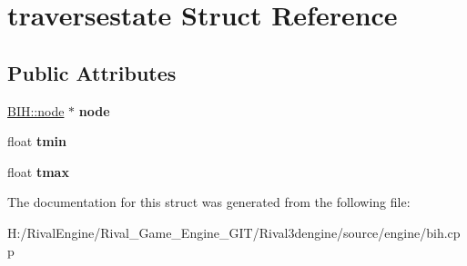 \hypertarget{structtraversestate}{}\section{traversestate Struct Reference}
\label{structtraversestate}
\subsection*{Public Attributes}
\begin{DoxyCompactItemize}
\item 
\mbox{\label{structtraversestate_af6d269c13f87eb542f1c0f374ca15661}} 
\hyperlink{struct_b_i_h_1_1node}{B\+I\+H\+::node} $\ast$ {\bfseries node}
\item 
\mbox{\label{structtraversestate_ad169c3a44f431c4c64904b4e9092d64f}} 
float {\bfseries tmin}
\item 
\mbox{\label{structtraversestate_a04f13cbf29383debad7cd2c248acca5a}} 
float {\bfseries tmax}
\end{DoxyCompactItemize}


The documentation for this struct was generated from the following file\+:\begin{DoxyCompactItemize}
\item 
H\+:/\+Rival\+Engine/\+Rival\+\_\+\+Game\+\_\+\+Engine\+\_\+\+G\+I\+T/\+Rival3dengine/source/engine/bih.\+cpp\end{DoxyCompactItemize}
